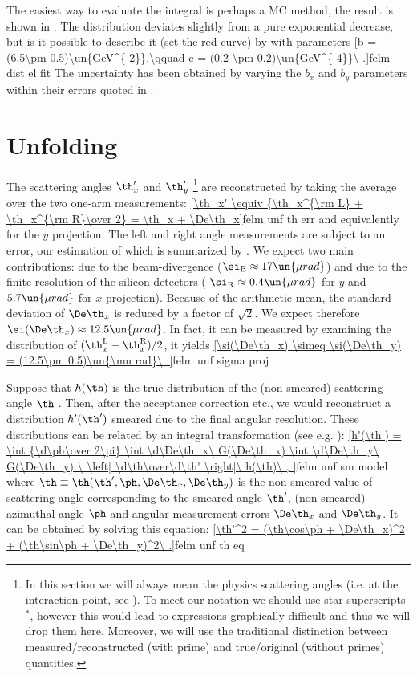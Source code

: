 The easiest way to evaluate the integral  is perhaps a MC method, the result is shown in . The distribution deviates slightly from a pure exponential decrease, but is it possible to describe it (set the red curve) by
with parameters
\eqref{b = (6.5\pm 0.5)\un{GeV^{-2}},\qquad c = (0.2 \pm 0.2)\un{GeV^{-4}}\ .}{felm dist el fit}
The uncertainty has been obtained by varying the $b_x$ and $b_y$ parameters within their errors quoted in .
\fi

\section{Unfolding}

The scattering angles $\th_x'$ and $\th_y'$ \footnote{
In this section we will always mean the physics scattering angles (i.e. at the interaction point, see ). To meet our notation we should use star superscripts $^*$, however this would lead to expressions graphically difficult and thus we will drop them here. Moreover, we will use the traditional distinction between measured/reconstructed (with prime) and true/original (without primes) quantities.
} are reconstructed by taking the average over the two one-arm measurements:
\eqref{\th_x' \equiv {\th_x^{\rm L} + \th_x^{\rm R}\over 2} = \th_x + \De\th_x}{felm unf th err}
and equivalently for the $y$ projection. The left and right angle measurements are subject to an error, our estimation of which is summarized by . We expect two main contributions: due to the beam-divergence ($\si_{\rm B} \approx 17\un{\mu rad}$) and due to the finite resolution of the silicon detectors (
$\si_{\rm R} \approx 0.4\un{\mu rad}$ for $y$ and $5.7\un{\mu rad}$ for $x$ projection). Because of the arithmetic mean, the standard deviation of $\De\th_x$ is reduced by a factor of $\sqrt 2$. We expect therefore $\si(\De\th_x) \approx 12.5\un{\mu rad}$. In fact, it can be measured by examining the distribution of $(\th_x^{\rm L} - \th_x^{\rm R})/2$, it yields
\eqref{\si(\De\th_x) \simeq \si(\De\th_y) = (12.5\pm 0.5)\un{\mu rad}\ .}{felm unf sigma proj}

Suppose that $h(\th)$ is the true distribution of the (non-smeared) scattering angle $\th$
. Then, after the acceptance correction etc., we would reconstruct a distribution $h'(\th')$ smeared due to the final angular resolution. These distributions can be related by an integral transformation (see e.g. ):
\eqref{h'(\th') = \int {\d\ph\over 2\pi} \int \d\De\th_x\ G(\De\th_x) \int \d\De\th_y\ G(\De\th_y)
	\ \left| \d\th\over\d\th' \right|\ h(\th)\ ,
}{felm unf sm model}
where $\th \equiv \th(\th', \ph, \De\th_x, \De\th_y)$ is the non-smeared value of scattering angle corresponding to the smeared angle $\th'$, (non-smeared) azimuthal angle $\ph$ and angular measurement errors $\De\th_x$ and $\De\th_y$. It can be obtained by solving this equation:
\eqref{\th'^2 = (\th\cos\ph + \De\th_x)^2 + (\th\sin\ph + \De\th_y)^2\ .}{felm unf th eq}

